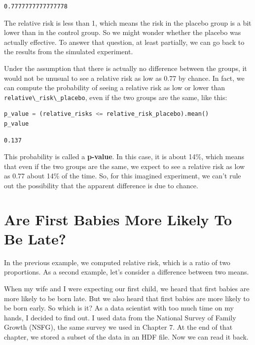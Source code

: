 \begin{lstlisting}[style=output]
0.7777777777777778
\end{lstlisting}

The relative risk is less than 1, which means the risk in the placebo
group is a bit lower than in the control group. So we might wonder
whether the placebo was actually effective. To answer that question, at
least partially, we can go back to the results from the simulated
experiment.

Under the assumption that there is actually no difference between the
groups, it would not be unusual to see a relative risk as low as 0.77 by
chance. In fact, we can compute the probability of seeing a relative
risk as low or lower than
\passthrough{\lstinline!relative\_risk\_placebo!}, even if the two
groups are the same, like this:

\begin{lstlisting}[language=Python,style=source]
p_value = (relative_risks <= relative_risk_placebo).mean()
p_value
\end{lstlisting}

\begin{lstlisting}[style=output]
0.137
\end{lstlisting}

This probability is called a \textbf{p-value}. In this case, it is about
14\%, which means that even if the two groups are the same, we expect to
see a relative risk as low as 0.77 about 14\% of the time. So, for this
imagined experiment, we can't rule out the possibility that the apparent
difference is due to chance.

\hypertarget{are-first-babies-more-likely-to-be-late}{%
\section{Are First Babies More Likely To Be
Late?}\label{are-first-babies-more-likely-to-be-late}}

In the previous example, we computed relative risk, which is a ratio of
two proportions. As a second example, let's consider a difference
between two means.

When my wife and I were expecting our first child, we heard that first
babies are more likely to be born late. But we also heard that first
babies are more likely to be born early. So which is it? As a data
scientist with too much time on my hands, I decided to find out. I used
data from the National Survey of Family Growth (NSFG), the same survey
we used in Chapter 7. At the end of that chapter, we stored a subset of
the data in an HDF file. Now we can read it back.

